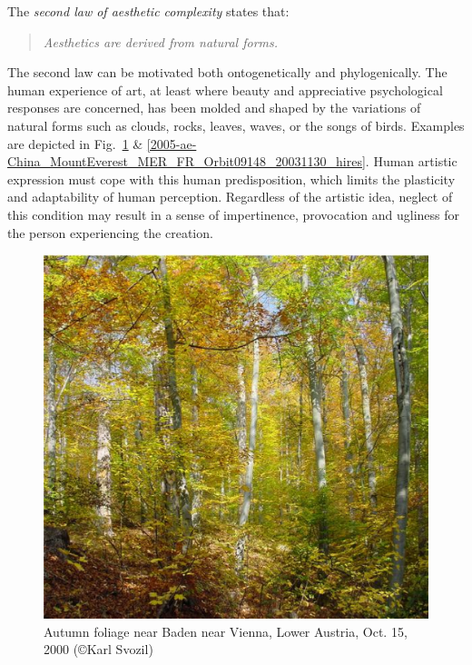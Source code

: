 \documentclass[rmp,amssymb,showpacs,showkeys,12pt,preprint]{revtex4}
\begin{document}
The \textit{second law of aesthetic complexity} states that:
\begin{quote}
{\em
Aesthetics are derived from natural forms.
}
\end{quote}

The second law can be motivated both ontogenetically and phylogenically.
The human experience of art, at least where beauty and appreciative psychological responses are concerned, has been molded and shaped by the variations of natural forms such as clouds, rocks, leaves, waves, or the songs of birds.
Examples are depicted in Fig.~\ref{2005-ae-foliage}
\& \ref{2005-ae-China_MountEverest_MER_FR_Orbit09148_20031130_hires}.
Human artistic expression must cope with this human predisposition, which limits the plasticity and adaptability of human perception.
Regardless of the artistic idea, neglect of this condition may result in a sense of impertinence, provocation and ugliness for the person experiencing the creation.

\begin{figure}
\centerline{\includegraphics[width=12cm]{2008-ae-foliage}}
  \caption{Autumn foliage near Baden near Vienna, Lower Austria, Oct. 15, 2000
(\copyright Karl Svozil)}
   \label{2005-ae-foliage}
 \end{figure}
\end{document}
